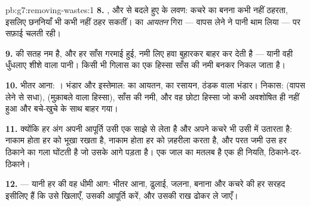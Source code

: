\begin{solution}{pb:g7:removing-wastes:1}
\textbf{8.} , और  से बदले हुए  के लवण: कचरे का बनना कभी
नहीं ठहरता, इसलिए छननियाँ भी कभी नहीं ठहर सकतीं।  का \emph{आयतन}
गिरा --- वापस लेने ने पानी थाम लिया --- पर सफ़ाई चलती रही।

\textbf{9.}  की सतह नम है, और हर साँस गरमाई हुई, नमी लिए हवा
बुहारकर बाहर कर देती है --- यानी वही धुँधलाए शीशे वाला पानी। किसी भी
गिलास का एक हिस्सा साँस की नमी बनकर निकल जाता है।

\textbf{10.} भीतर आना: । भंडार और इस्तेमाल:  का आयतन,
 का रसायन, ठंडक वाला भंडार। निकास:  (वापस लेने से सधा),
 (मुक़ाबले वाला हिस्सा), साँस की नमी, और वह छोटा हिस्सा जो कभी
अवशोषित ही नहीं हुआ और बचे-खुचे के साथ बाहर गया।

\textbf{11.} क्योंकि हर अंग अपनी आपूर्ति उसी एक साझे  से लेता है
और अपने कचरे भी उसी में उतारता है: नाकाम होता  हर  को भूखा
रखता है, नाकाम होता  हर  को ज़हरीला करता है, और परत जमी
 उस हर ठिकाने का गला घोंटती है जो उसके आगे पड़ता है। एक जाल का मतलब
है एक ही नियति, ठिकाने-दर-ठिकाने।

\textbf{12.}  --- यानी हर  की वह धीमी आग: भीतर आना, ढुलाई,
जलना, बनाना और कचरे की हर सरहद इसीलिए हैं कि उसे खिलाएँ, उसकी आपूर्ति
करें, और उसकी राख ढोकर ले जाएँ।
\end{solution}
